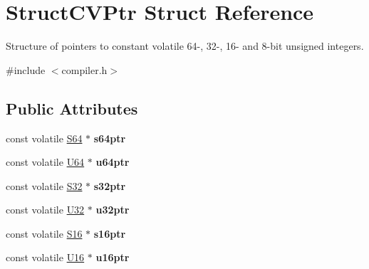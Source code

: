 \hypertarget{struct_struct_c_v_ptr}{\section{Struct\-C\-V\-Ptr Struct Reference}
\label{struct_struct_c_v_ptr}
}


Structure of pointers to constant volatile 64-\/, 32-\/, 16-\/ and 8-\/bit unsigned integers.  




{\ttfamily \#include $<$compiler.\-h$>$}

\subsection*{Public Attributes}
\begin{DoxyCompactItemize}
\item 
\hypertarget{struct_struct_c_v_ptr_a19ef459699971931ad9ba2237a1e94b5}{const volatile \hyperlink{group__group__xmega__utils_ga1d293e5c494dd6826239b02f5fe98e7f}{S64} $\ast$ {\bfseries s64ptr}}\label{struct_struct_c_v_ptr_a19ef459699971931ad9ba2237a1e94b5}

\item 
\hypertarget{struct_struct_c_v_ptr_aac7addfa477ae9ae941add494152e94b}{const volatile \hyperlink{group__group__xmega__utils_ga25809e0734a149248fcf5831efa4e33d}{U64} $\ast$ {\bfseries u64ptr}}\label{struct_struct_c_v_ptr_aac7addfa477ae9ae941add494152e94b}

\item 
\hypertarget{struct_struct_c_v_ptr_a6967ea819f181d054e47b82319745be9}{const volatile \hyperlink{group__group__xmega__utils_ga39c786017723555afb9e8b85accec0de}{S32} $\ast$ {\bfseries s32ptr}}\label{struct_struct_c_v_ptr_a6967ea819f181d054e47b82319745be9}

\item 
\hypertarget{struct_struct_c_v_ptr_a8b3e4acbf9aa9e133195d9f3da7e1067}{const volatile \hyperlink{group__group__xmega__utils_ga696390429f2f3b644bde8d0322a24124}{U32} $\ast$ {\bfseries u32ptr}}\label{struct_struct_c_v_ptr_a8b3e4acbf9aa9e133195d9f3da7e1067}

\item 
\hypertarget{struct_struct_c_v_ptr_a97657743440108335f1fe603e6160f25}{const volatile \hyperlink{group__group__xmega__utils_ga6d241ad21a823c90d4835380787db5d4}{S16} $\ast$ {\bfseries s16ptr}}\label{struct_struct_c_v_ptr_a97657743440108335f1fe603e6160f25}

\item 
\hypertarget{struct_struct_c_v_ptr_a7f767f45320067a836c24f092f133b1c}{const volatile \hyperlink{group__group__xmega__utils_ga0a0a322d5fa4a546d293a77ba8b4a71f}{U16} $\ast$ {\bfseries u16ptr}}\label{struct_struct_c_v_ptr_a7f767f45320067a836c24f092f133b1c}


\end{DoxyCompactItemize}
